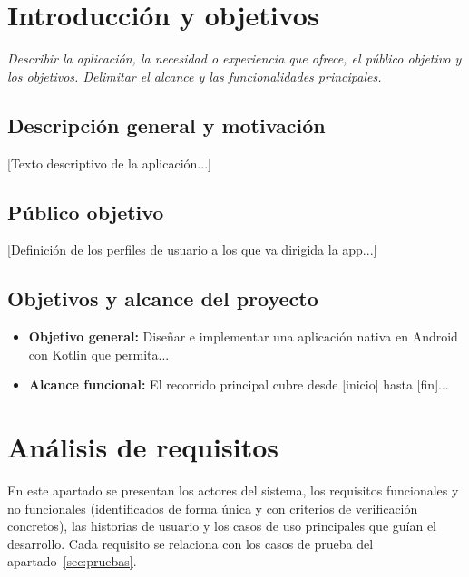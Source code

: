 \documentclass[11pt,a4paper]{article}
\begin{document}
\section{Introducción y objetivos}
\textit{Describir la aplicación, la necesidad o experiencia que ofrece, el público objetivo y los objetivos. Delimitar el alcance y las funcionalidades principales.}

\subsection{Descripción general y motivación}
[Texto descriptivo de la aplicación...]

\subsection{Público objetivo}
[Definición de los perfiles de usuario a los que va dirigida la app...]

\subsection{Objetivos y alcance del proyecto}
\begin{itemize}
    \item \textbf{Objetivo general:} Diseñar e implementar una aplicación nativa en Android con Kotlin que permita...
    \item \textbf{Alcance funcional:} El recorrido principal cubre desde [inicio] hasta [fin]...
\end{itemize}

\section{Análisis de requisitos}
En este apartado se presentan los actores del sistema, los requisitos funcionales y no funcionales (identificados de forma única y con criterios de verificación concretos), las historias de usuario y los casos de uso principales que guían el desarrollo. Cada requisito se relaciona con los casos de prueba del apartado~\ref{sec:pruebas}.
\end{document}
